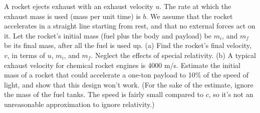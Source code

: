  A rocket ejects exhaust with an exhaust velocity $u$.
The rate at which the exhaust mass is used (mass per unit
time) is $b$. We assume that the rocket accelerates in a
straight line starting from rest, and that no external
forces act on it. Let the rocket's initial mass (fuel plus
the body and payload) be $m_i$, and $m_f$ be its final mass,
after all the fuel is used up. (a) Find the rocket's final
velocity, $v$, in terms of $u$, $m_i$, and $m_f$. Neglect the effects
of special relativity. (b) A
typical exhaust velocity for chemical rocket engines is 4000
m/s. Estimate the initial mass of a rocket that could
accelerate a one-ton payload to 10\% of the speed of light,
and show that this design won't work. (For the sake of the
estimate, ignore the mass of the fuel tanks. The speed is fairly
small compared to $c$, so it's not an unreasonable approximation
to ignore relativity.)
\answercheck

